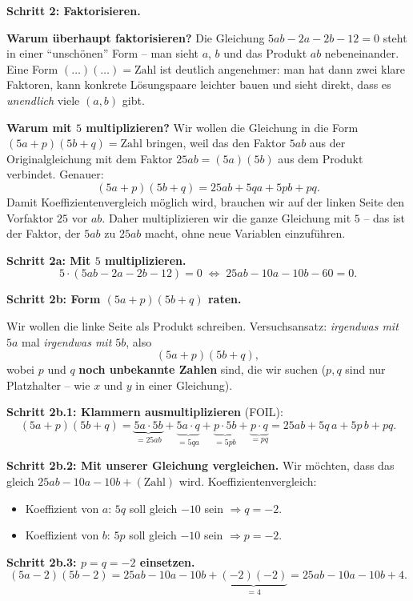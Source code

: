 \documentclass[a4paper,12pt]{article}
\begin{document}
\textbf{Schritt 2: Faktorisieren.}

\textbf{Warum \"uberhaupt faktorisieren?} Die Gleichung $5ab - 2a - 2b - 12 = 0$ steht in einer ``unsch\"onen'' Form -- man sieht $a$, $b$ und das Produkt $ab$ nebeneinander. Eine Form $(\dots)(\dots) = \text{Zahl}$ ist deutlich angenehmer: man hat dann zwei klare Faktoren, kann konkrete L\"osungspaare leichter bauen und sieht direkt, dass es \emph{unendlich} viele $(a, b)$ gibt.

\textbf{Warum mit $5$ multiplizieren?} Wir wollen die Gleichung in die Form $(5a + p)(5b + q) = \text{Zahl}$ bringen, weil das den Faktor $5ab$ aus der Originalgleichung mit dem Faktor $25ab = (5a)(5b)$ aus dem Produkt verbindet. Genauer:
\[
(5a + p)(5b + q) = 25ab + 5qa + 5pb + pq.
\]
Damit Koeffizientenvergleich m\"oglich wird, brauchen wir auf der linken Seite den Vorfaktor $25$ vor $ab$. Daher multiplizieren wir die ganze Gleichung mit $5$ -- das ist der Faktor, der $5ab$ zu $25ab$ macht, ohne neue Variablen einzuf\"uhren.

\textbf{Schritt 2a: Mit $5$ multiplizieren.}
\[
5 \cdot (5ab - 2a - 2b - 12) = 0 \;\Longleftrightarrow\; 25ab - 10a - 10b - 60 = 0.
\]

\textbf{Schritt 2b: Form $(5a + p)(5b + q)$ raten.}

Wir wollen die linke Seite als Produkt schreiben. Versuchsansatz: \emph{irgendwas mit $5a$} mal \emph{irgendwas mit $5b$}, also
\[
(5a + p)(5b + q),
\]
wobei $p$ und $q$ \textbf{noch unbekannte Zahlen} sind, die wir suchen ($p, q$ sind nur Platzhalter -- wie $x$ und $y$ in einer Gleichung).

\textbf{Schritt 2b.1: Klammern ausmultiplizieren} (FOIL):
\[
(5a + p)(5b + q) = \underbrace{5a \cdot 5b}_{= 25ab} + \underbrace{5a \cdot q}_{= 5qa} + \underbrace{p \cdot 5b}_{= 5pb} + \underbrace{p \cdot q}_{= pq}
= 25ab + 5q\, a + 5p\, b + pq.
\]

\textbf{Schritt 2b.2: Mit unserer Gleichung vergleichen.} Wir m\"ochten, dass das gleich $25ab - 10a - 10b + (\text{Zahl})$ wird. Koeffizientenvergleich:
\begin{itemize}[leftmargin=*, nosep]
    \item Koeffizient von $a$: $5q$ soll gleich $-10$ sein $\Rightarrow q = -2$.
    \item Koeffizient von $b$: $5p$ soll gleich $-10$ sein $\Rightarrow p = -2$.
\end{itemize}

\textbf{Schritt 2b.3: $p = q = -2$ einsetzen.}
\[
(5a - 2)(5b - 2) = 25ab - 10a - 10b + \underbrace{(-2)(-2)}_{= 4} = 25ab - 10a - 10b + 4.
\]
\end{document}
